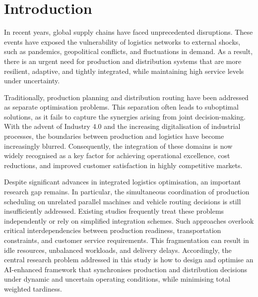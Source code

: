 \documentclass{article}
\begin{document}

\section{Introduction}
\label{sec:introduction}

In recent years, global supply chains have faced unprecedented disruptions. These events have exposed the vulnerability of logistics networks to external shocks, such as pandemics, geopolitical conflicts, and fluctuations in demand. As a result, there is an urgent need for production and distribution systems that are more resilient, adaptive, and tightly integrated, while maintaining high service levels under uncertainty.

Traditionally, production planning and distribution routing have been addressed as separate optimisation problems. This separation often leads to suboptimal solutions, as it fails to capture the synergies arising from joint decision-making. With the advent of Industry 4.0 and the increasing digitalisation of industrial processes, the boundaries between production and logistics have become increasingly blurred. Consequently, the integration of these domains is now widely recognised as a key factor for achieving operational excellence, cost reductions, and improved customer satisfaction in highly competitive markets.

Despite significant advances in integrated logistics optimisation, an important research gap remains. In particular, the simultaneous coordination of production scheduling on unrelated parallel machines and vehicle routing decisions is still insufficiently addressed. Existing studies frequently treat these problems independently or rely on simplified integration schemes. Such approaches overlook critical interdependencies between production readiness, transportation constraints, and customer service requirements. This fragmentation can result in idle resources, unbalanced workloads, and delivery delays. Accordingly, the central research problem addressed in this study is how to design and optimise an AI-enhanced framework that synchronises production and distribution decisions under dynamic and uncertain operating conditions, while minimising total weighted tardiness.
\end{document}
